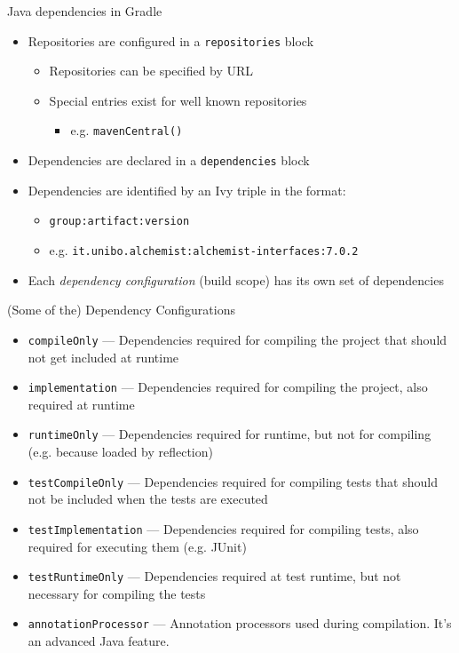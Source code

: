 \documentclass[presentation]{beamer}
\begin{document}
\begin{frame}[fragile]{Java dependencies in Gradle}
    \begin{itemize}
        \item Repositories are configured in a \texttt{repositories} block
        \begin{itemize}
            \item Repositories can be specified by URL
            \item Special entries exist for well known repositories
            \begin{itemize}
             \item e.g. \texttt{mavenCentral()}
            \end{itemize}
        \end{itemize}
        \item Dependencies are declared in a \texttt{dependencies} block
        \item Dependencies are identified by an Ivy triple in the format:
        \begin{itemize}
            \item \texttt{\color{blue}group\color{black}:\color{red}artifact\color{black}:\color{olive}version}
            \item e.g. \texttt{\color{blue}it.unibo.alchemist\color{black}:\color{red}alchemist-interfaces\color{black}:\color{olive}7.0.2}
        \end{itemize}
        \item Each \textit{dependency configuration} (build scope) has its own set of dependencies
    \end{itemize}
\end{frame}

\begin{frame}[fragile]{(Some of the) Dependency Configurations}
    \begin{itemize}
        \item \texttt{compileOnly} --- Dependencies required for compiling the project that should not get included at runtime
        \item \texttt{implementation} --- Dependencies required for compiling the project, also required at runtime
        \item \texttt{runtimeOnly} --- Dependencies required for runtime, but not for compiling (e.g. because loaded by reflection)
        \item \texttt{testCompileOnly} --- Dependencies required for compiling tests that should not be included when the tests are executed
        \item \texttt{testImplementation} --- Dependencies required for compiling tests, also required for executing them (e.g. JUnit)
        \item \texttt{testRuntimeOnly} --- Dependencies required at test runtime, but not necessary for compiling the tests
        \item \texttt{annotationProcessor} --- Annotation processors used during compilation. It's an advanced Java feature.
    \end{itemize}
\end{frame}
\end{document}
